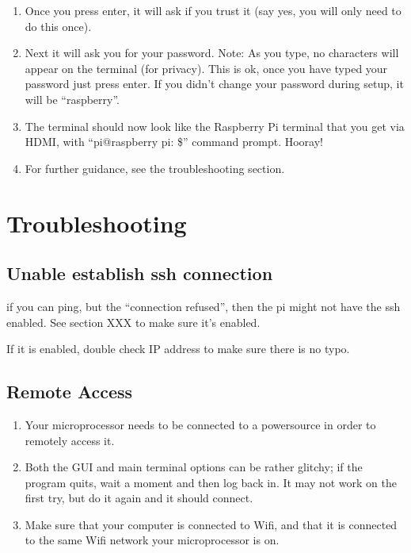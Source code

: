 \documentclass{article}\usepackage[]{graphicx}\usepackage[]{color}
\begin{document}
\begin{enumerate}
\item Once you press enter, it will ask if you trust it (say yes, you will only need to do this once). 

\item Next it will ask you for your password.  Note: As you type, no characters will appear on the terminal (for privacy).  This is ok, once you have typed your password just press enter.  If you didn't change your password during setup, it will be ``raspberry''.

\item The terminal should now look like the Raspberry Pi terminal that you get via HDMI, with ``pi@raspberry pi: \$'' command prompt.  Hooray!

\item For further guidance, see the troubleshooting section.

\end{enumerate}


\section{Troubleshooting}

\subsection{Unable establish ssh connection}

if you can ping, but the ``connection refused'', then the pi might not have the ssh enabled. See section XXX to make sure it's enabled. 

If it is enabled, double check IP address to make sure there is no typo.



\subsection{Remote Access}

\begin{enumerate}

\item Your microprocessor needs to be connected to a powersource in order to remotely access it.

\item Both the GUI and main terminal options can be rather glitchy; if the program quits, wait a moment and then log back in.  It may not work on the first try, but do it again and it should connect.

\item Make sure that your computer is connected to Wifi, and that it is connected to the same Wifi network your microprocessor is on.

\end{enumerate}
\end{document}
